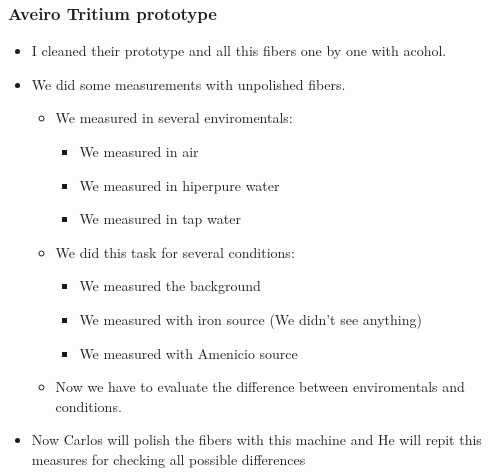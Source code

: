 \documentclass{beamer}
\begin{document}
\begin{frame}
\frametitle{Aveiro Tritium prototype}
  
\begin{itemize}
\item{} I cleaned their prototype and all this fibers one by one with acohol.
\item{} We did some measurements with unpolished fibers.
\begin{itemize}
\item{} We measured in several enviromentals:
\begin{itemize}
\item{} We measured in air
\item{} We measured in hiperpure water
\item{} We measured in tap water
\end{itemize}
\item{} We did this task for several conditions:
\begin{itemize}
\item{} We measured the background
\item{} We measured with iron source (We didn't see anything)
\item{} We measured with Amenicio source
\end{itemize}
\item{} Now we have to evaluate the difference between enviromentals and conditions.
\end{itemize}
\item{} Now Carlos will polish the fibers with this machine and He will repit this measures for checking all possible differences
\end{itemize}
\end{frame}
\end{document}
